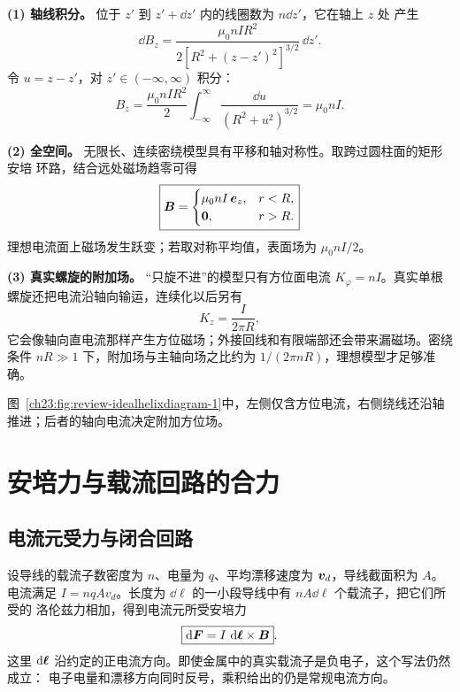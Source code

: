 {\begin{xesolution}
\textbf{(1) 轴线积分。} 位于 $z'$ 到 $z'+\dd z'$ 内的线圈数为 $n\dd z'$，它在轴上 $z$ 处
产生
\[
  \dd B_z=\frac{\mu_0nIR^2}{2[R^2+(z-z')^2]^{3/2}}\,\dd z'.
\]
令 $u=z-z'$，对 $z'\in(-\infty,\infty)$ 积分：
\[
  B_z=\frac{\mu_0nIR^2}{2}
  \int_{-\infty}^{\infty}\frac{\dd u}{(R^2+u^2)^{3/2}}
  =\boxed{\mu_0nI}.
\]

\textbf{(2) 全空间。} 无限长、连续密绕模型具有平移和轴对称性。取跨过圆柱面的矩形安培
环路，结合远处磁场趋零可得
\begin{equation}
  \boxed{\bm{B}=
  \begin{cases}
    \mu_0nI\,\bm{e}_z,&r<R,\\
    \bm{0},&r>R.
  \end{cases}}
\end{equation}
理想电流面上磁场发生跃变；若取对称平均值，表面场为 $\mu_0nI/2$。

\textbf{(3) 真实螺旋的附加场。} “只旋不进”的模型只有方位面电流
$K_\varphi=nI$。真实单根螺旋还把电流沿轴向输运，连续化以后另有
\[
  K_z=\frac{I}{2\pi R},
\]
它会像轴向直电流那样产生方位磁场；外接回线和有限端部还会带来漏磁场。密绕条件
$nR\gg1$ 下，附加场与主轴向场之比约为 $1/(2\pi nR)$，理想模型才足够准确。

图~\ref{ch23:fig:review-idealhelixdiagram-1}中，左侧仅含方位电流，右侧绕线还沿轴推进；后者的轴向电流决定附加方位场。
\par\noindent\begin{minipage}{\linewidth}
\idealHelixDiagram
{}
\end{minipage}\par\medskip
\end{xesolution}



\section{安培力与载流回路的合力}

\subsection{电流元受力与闭合回路}


设导线的载流子数密度为 $n$、电量为 $q$、平均漂移速度为 $\bm{v}_d$，导线截面积为 $A$。
电流满足 $I=nqAv_d$。长度为 $\dd\ell$ 的一小段导线中有 $nA\dd\ell$ 个载流子，把它们所受的
洛伦兹力相加，得到电流元所受安培力
\begin{equation}
  \boxed{\mathop{}\!\mathrm d\bm{F}=I\,\mathop{}\!\mathrm d\bm{\ell}\times\bm{B}}.
\end{equation}
这里 $\mathop{}\!\mathrm d\bm{\ell}$ 沿约定的正电流方向。即使金属中的真实载流子是负电子，这个写法仍然成立：
电子电量和漂移方向同时反号，乘积给出的仍是常规电流方向。

}
